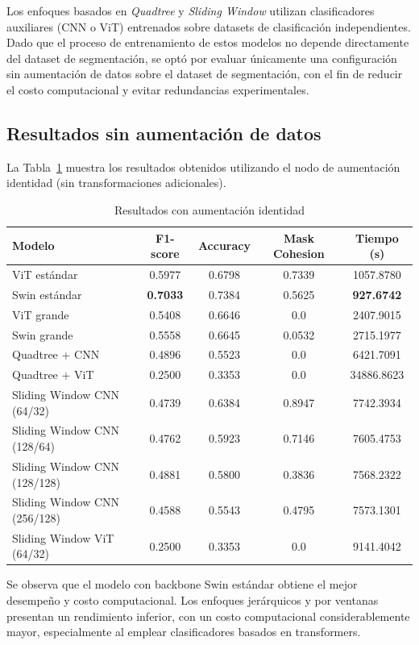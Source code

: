 \documentclass[onecolumn, 12pt , journal]{IEEEtran}
\begin{document}
Los enfoques basados en \emph{Quadtree} y \emph{Sliding Window} utilizan clasificadores auxiliares (CNN o ViT) entrenados sobre datasets de clasificación independientes. Dado que el proceso de entrenamiento de estos modelos no depende directamente del dataset de segmentación, se optó por evaluar únicamente una configuración sin aumentación de datos sobre el dataset de segmentación, con el fin de reducir el costo computacional y evitar redundancias experimentales.

\subsection{Resultados sin aumentación de datos}

La Tabla~\ref{tab:results_identity} muestra los resultados obtenidos utilizando el nodo de aumentación identidad (sin transformaciones adicionales).

\begin{table}[ht]
\centering
\caption{Resultados con aumentación identidad}
\label{tab:results_identity}
\begin{tabular}{lcccc}
\hline
\textbf{Modelo} & \textbf{F1-score} & \textbf{Accuracy} & \textbf{Mask Cohesion} & \textbf{Tiempo (s)} \\
\hline
ViT estándar & 0.5977 & 0.6798 & 0.7339 & 1057.8780 \\
Swin estándar & \textbf{0.7033} & 0.7384 & 0.5625 & \textbf{927.6742} \\
ViT grande & 0.5408 & 0.6646 & 0.0 & 2407.9015 \\
Swin grande & 0.5558 & 0.6645 & 0.0532 & 2715.1977 \\
Quadtree + CNN & 0.4896 & 0.5523 & 0.0 & 6421.7091 \\
Quadtree + ViT & 0.2500 & 0.3353 & 0.0 & 34886.8623 \\
Sliding Window CNN (64/32) & 0.4739 & 0.6384 & 0.8947 & 7742.3934 \\
Sliding Window CNN (128/64) & 0.4762 & 0.5923 & 0.7146 & 7605.4753 \\
Sliding Window CNN (128/128) & 0.4881 & 0.5800 & 0.3836 & 7568.2322 \\
Sliding Window CNN (256/128) & 0.4588 & 0.5543 & 0.4795 & 7573.1301 \\
Sliding Window ViT (64/32) & 0.2500 & 0.3353 & 0.0 & 9141.4042 \\
\hline
\end{tabular}
\end{table}

Se observa que el modelo con backbone Swin estándar obtiene el mejor desempeño y costo computacional. Los enfoques jerárquicos y por ventanas presentan un rendimiento inferior, con un costo computacional considerablemente mayor, especialmente al emplear clasificadores basados en transformers.
\end{document}

